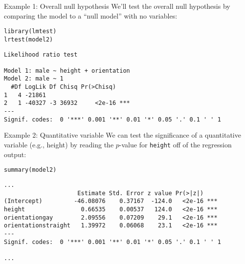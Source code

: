 \documentclass{beamer}\usepackage[]{graphicx}\usepackage[]{color}
\makeatletter
\newcommand{\hlstd}[1]{\textcolor[rgb]{1,0.894,0.769}{#1}}%
\newcommand{\hlkwd}[1]{\textcolor[rgb]{1,0.78,0.769}{#1}}%
\newenvironment{kframe}{%
 \def\at@end@of@kframe{}%
 \ifinner\ifhmode%
  \def\at@end@of@kframe{\end{minipage}}%
  \begin{minipage}{\columnwidth}%
 \fi\fi%
 \def\FrameCommand##1{\hskip\@totalleftmargin \hskip-\fboxsep
 \colorbox{shadecolor}{##1}\hskip-\fboxsep
     \hskip-\linewidth \hskip-\@totalleftmargin \hskip\columnwidth}%
 \MakeFramed {\advance\hsize-\width
   \@totalleftmargin\z@ \linewidth\hsize
   \@setminipage}}%
 {\par\unskip\endMakeFramed%
 \at@end@of@kframe}
\newenvironment{knitrout}{}{} %
\makeatother
\begin{document}
\begin{darkframes}
    \begin{frame}[fragile]{Example 1: Overall null hypothesis}
      We'll test the overall null hypothesis by comparing the model to a ``null model'' with no variables:
      \fontvsm
\begin{knitrout}
\begin{kframe}
\begin{alltt}
\hlkwd{library}\hlstd{(lmtest)}
\hlkwd{lrtest}\hlstd{(model2)}
\end{alltt}
\begin{verbatim}
Likelihood ratio test

Model 1: male ~ height + orientation
Model 2: male ~ 1
  #Df LogLik Df Chisq Pr(>Chisq)    
1   4 -21861                        
2   1 -40327 -3 36932     <2e-16 ***
---
Signif. codes:  0 '***' 0.001 '**' 0.01 '*' 0.05 '.' 0.1 ' ' 1
\end{verbatim}
\end{kframe}
\end{knitrout}
    \end{frame}

    \begin{frame}[fragile]{Example 2: Quantitative variable}
      We can test the significance of a quantitative variable (e.g., height) by reading the $p$-value for \texttt{height} off of the regression output:

      \fontvsm
\begin{knitrout}
\begin{kframe}
\begin{alltt}
\hlkwd{summary}\hlstd{(model2)}
\end{alltt}
\begin{verbatim}
...
                     Estimate Std. Error z value Pr(>|z|)    
(Intercept)         -46.08076    0.37167  -124.0   <2e-16 ***
height                0.66535    0.00537   124.0   <2e-16 ***
orientationgay        2.09556    0.07209    29.1   <2e-16 ***
orientationstraight   1.39972    0.06068    23.1   <2e-16 ***
---
Signif. codes:  0 '***' 0.001 '**' 0.01 '*' 0.05 '.' 0.1 ' ' 1

...

\end{verbatim}
\end{kframe}
\end{knitrout}
    \end{frame}


\end{darkframes}
\end{document}
